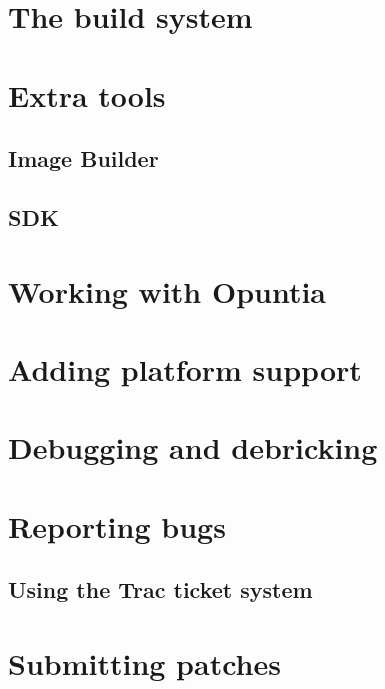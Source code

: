 \documentclass[a4paper]{book}
\begin{document}
  \section{The build system}
    
  \section{Extra tools}
    \subsection{Image Builder}
    \subsection{SDK}
  \section{Working with Opuntia}
    
  \section{Adding platform support}
     
  \section{Debugging and debricking}
     
   \section{Reporting bugs}
	\subsection{Using the Trac ticket system}
	
   \section{Submitting patches}
    
\end{document}
